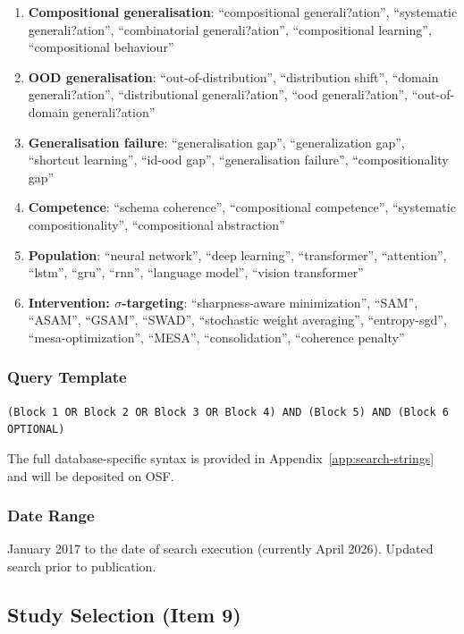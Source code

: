 \begin{enumerate}[label=Block \arabic*:, nosep]
\item \textbf{Compositional generalisation}: ``compositional generali?ation'', ``systematic generali?ation'', ``combinatorial generali?ation'', ``compositional learning'', ``compositional behaviour''
\item \textbf{OOD generalisation}: ``out-of-distribution'', ``distribution shift'', ``domain generali?ation'', ``distributional generali?ation'', ``ood generali?ation'', ``out-of-domain generali?ation''
\item \textbf{Generalisation failure}: ``generalisation gap'', ``generalization gap'', ``shortcut learning'', ``id-ood gap'', ``generalisation failure'', ``compositionality gap''
\item \textbf{Competence}: ``schema coherence'', ``compositional competence'', ``systematic compositionality'', ``compositional abstraction''
\item \textbf{Population}: ``neural network'', ``deep learning'', ``transformer'', ``attention'', ``lstm'', ``gru'', ``rnn'', ``language model'', ``vision transformer''
\item \textbf{Intervention: $\sigma$-targeting}: ``sharpness-aware minimization'', ``SAM'', ``ASAM'', ``GSAM'', ``SWAD'', ``stochastic weight averaging'', ``entropy-sgd'', ``mesa-optimization'', ``MESA'', ``consolidation'', ``coherence penalty''
\end{enumerate}

\subsubsection{Query Template}

\texttt{(Block~1 OR Block~2 OR Block~3 OR Block~4) AND (Block~5) AND (Block~6 OPTIONAL)}

The full database-specific syntax is provided in Appendix~\ref{app:search-strings} and will be deposited on OSF.

\subsubsection{Date Range}

January 2017 to the date of search execution (currently April 2026). Updated search prior to publication.

\subsection{Study Selection (Item 9)}

